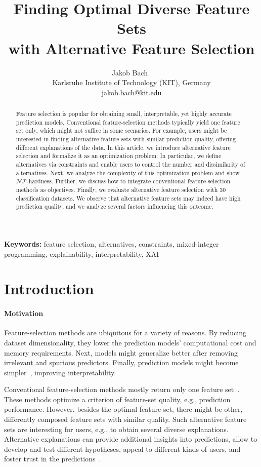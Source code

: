 \documentclass{article}
\title{
	Finding Optimal Diverse Feature Sets\texorpdfstring{\\}{ }with Alternative Feature Selection
}
\author{
	Jakob Bach~\orcidlink{0000-0003-0301-2798}\\
	\small Karlsruhe Institute of Technology (KIT), Germany\\
	\small \href{mailto:jakob.bach@kit.edu}{jakob.bach@kit.edu}
}
\date{} %
\theoremstyle{definition}
\begin{document}
\maketitle

\begin{abstract}
Feature selection is popular for obtaining small, interpretable, yet highly accurate prediction models.
Conventional feature-selection methods typically yield one feature set only, which might not suffice in some scenarios.
For example, users might be interested in finding alternative feature sets with similar prediction quality, offering different explanations of the data.
In this article, we introduce alternative feature selection and formalize it as an optimization problem.
In particular, we define alternatives via constraints and enable users to control the number and dissimilarity of alternatives.
Next, we analyze the complexity of this optimization problem and show $\mathcal{NP}$-hardness.
Further, we discuss how to integrate conventional feature-selection methods as objectives.
Finally, we evaluate alternative feature selection with 30 classification datasets.
We observe that alternative feature sets may indeed have high prediction quality, and we analyze several factors influencing this outcome.
\end{abstract}
%
\textbf{Keywords:} feature selection, alternatives, constraints, mixed-integer programming, explainability, interpretability, XAI

\section{Introduction}
\label{sec:afs:introduction}

\paragraph{Motivation}

Feature-selection methods are ubiquitous for a variety of reasons.
By reducing dataset dimensionality, they lower the prediction models' computational cost and memory requirements.
Next, models might generalize better after removing irrelevant and spurious predictors.
Finally, prediction models might become simpler~\cite{li2017feature}, improving interpretability.

Conventional feature-selection methods mostly return only one feature set~\cite{borboudakis2021extending}.
These methods optimize a criterion of feature-set quality, e.g., prediction performance.
However, besides the optimal feature set, there might be other, differently composed feature sets with similar quality.
Such alternative feature sets are interesting for users, e.g., to obtain several diverse explanations.
Alternative explanations can provide additional insights into predictions, allow to develop and test different hypotheses, appeal to different kinds of users, and foster trust in the predictions~\cite{kim2021multi, wang2019designing}.
\end{document}

